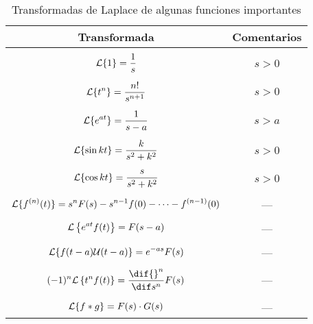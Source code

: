 \documentclass[../ecuaciones_diferenciales.tex]{subfiles}
\begin{document}
\begin{table}[ht]
	\centering
	\begin{tabular}{c|c}
		Transformada                                                 & Comentarios
		\\[0.7em] \hline \\[-1.0em]
		\(\displaystyle \mathcal{L}\{1\} = \frac{1}{s}\)                      & \(s>0\)
		\\[0.7em] \hline \\[-1.0em]
		\(\displaystyle \mathcal{L}\{t^n\} = \frac{n!}{s^{n+1}}\)             & \(s>0\)
		\\[0.7em] \hline \\[-1.0em]
		\(\displaystyle \mathcal{L}\{e^{at}\} = \frac{1}{s-a}\)               & \(s>a\)
		\\[0.7em] \hline \\[-1.0em]
		\(\displaystyle \mathcal{L}\{\sin kt\} = \frac{k}{s^2+k^2}\)          & \(s>0\)
		\\[0.7em] \hline \\[-1.0em]
		\(\displaystyle \mathcal{L}\{\cos kt\} = \frac{s}{s^2+k^2}\)          & \(s>0\)
		\\[0.7em] \hline \\[-1.0em]
		\(\displaystyle \mathcal{L}\{f^{(n)}(t)\} = s^nF(s) - s^{n-1}f(0) - \cdots -
		f^{(n-1)}(0)\)                                               & ---
		\\[0.4em] \hline \\[-1.0em]
		\(\displaystyle \mathcal{L}\left\{e^{at}f(t)\right\} = F(s-a)\)       & ---
		\\[0.4em] \hline \\[-1.0em]
		\(\displaystyle \mathcal{L}\{f(t-a)\mathcal{U}(t-a)\} = e^{-as}F(s)\) & ---
		\\[0.4em] \hline \\[-1.0em]
		\(\displaystyle (-1)^n\L\left\{t^nf(t)\right\} = \frac{\dif {}^n}{\dif s^n}
		F(s)\)                                                       & ---
		\\[0.7em] \hline \\[-1.0em]
		\(\displaystyle \mathcal{L}\{f \ast g\} = F(s) \cdot G(s)\)           & ---
	\end{tabular}%
	\caption{Transformadas de Laplace de algunas funciones importantes}
\end{table}
\end{document}
